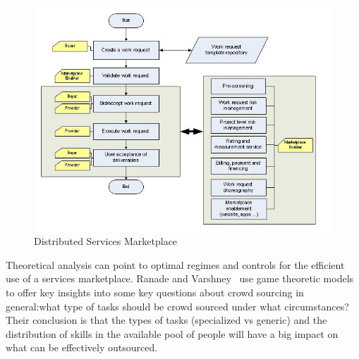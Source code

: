  \begin{figure}[H]
\centering
\includegraphics[bb=0 0 500 400, scale=0.5]{figs/glomarketplace.jpg}
\caption{Distributed Services Marketplace}
\label{glomarketplace}
\end{figure}

 Theoretical analysis can point to optimal regimes and controls for the efficient use of a services marketplace. Ranade and Varshney~\cite{glo-ranade} use game theoretic models to offer key insights into some key questions about crowd sourcing in general:what type of tasks should be crowd sourced under what circumstances? Their conclusion is that  the types of tasks (specialized vs generic) and the distribution of skills in the available pool of people will have a big impact on what can be effectively outsourced.

\label{sec:global}



